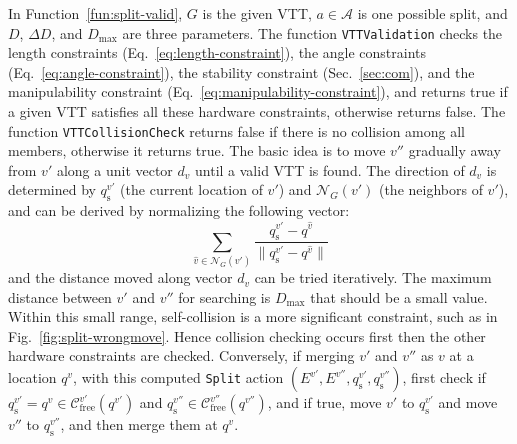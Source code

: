 \documentclass[journal]{IEEEtran}
\begin{document}
In Function~\ref{fun:split-valid}, $G$ is the given VTT,
$a\in \mathcal{A}$ is one possible split, and $D$, $\Delta D$, and
$D_{\max}$ are three parameters. The function \texttt{VTTValidation}
checks the length constraints (Eq.~\eqref{eq:length-constraint}), the
angle constraints (Eq.~\eqref{eq:angle-constraint}), the stability
constraint (Sec.~\ref{sec:com}), and the manipulability constraint
(Eq.~\eqref{eq:manipulability-constraint}), and returns true if a
given VTT satisfies all these hardware constraints, otherwise returns
false. The function \texttt{VTTCollisionCheck} returns false if there
is no collision among all members, otherwise it returns true. The
basic idea is to move $v''$ gradually away from $v'$ along a unit
vector $d_v$ until a valid VTT is found. The direction of $d_v$ is
determined by $q_{\mathrm{s}}^{v'}$ (the current location of $v'$) and
$\mathcal{N}_G(v')$ (the neighbors of $v'$), and can be derived by
normalizing the following vector:
\begin{equation}
  \label{eq:split-dir-normalize}
  \sum_{\hat{v}\in\mathcal{N}_G(v')}\frac{q_{\mathrm{s}}^{v'}-q^{\hat{v}}}{\|q_{\mathrm{s}}^{v'}-q^{\hat{v}}\|}
\end{equation}
and the distance moved along vector $d_v$ can be tried iteratively.
The maximum distance between $v'$ and $v''$ for searching is
$D_{\max}$ that should be a small value. Within this small range,
self-collision is a more significant constraint, such as in
Fig.~\ref{fig:split-wrongmove}. Hence collision checking occurs first
then the other hardware constraints are checked. Conversely, if
merging $v'$ and $v''$ as $v$ at a location $q^v$, with this computed
\texttt{Split} action
$(E^{v'}, E^{v''}, q_{\mathrm{s}}^{v'}, q_{\mathrm{s}}^{v''})$, first
check if
$q_{\mathrm{s}}^{v'} = q^v\in
\mathcal{C}_{\mathrm{free}}^{v'}(q^{v'})$ and
$q_{\mathrm{s}}^{v''}\in \mathcal{C}_{\mathrm{free}}^{v''}(q^{v''})$,
and if true, move $v'$ to $q_{\mathrm{s}}^{v'}$ and move $v''$ to
$q_{\mathrm{s}}^{v''}$, and then merge them at $q^v$.
\end{document}
